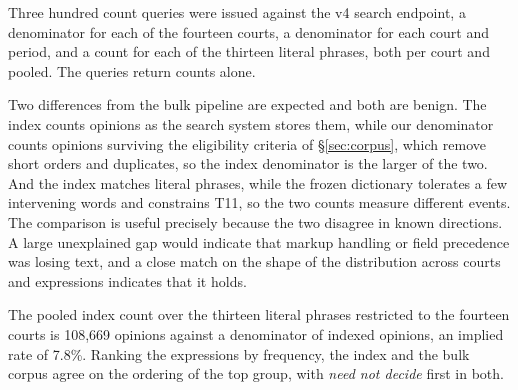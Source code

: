 Three hundred count queries were issued against the v4 search endpoint, a
denominator for each of the fourteen courts, a denominator for each court and
period, and a count for each of the thirteen literal phrases, both per court and
pooled. The queries return counts alone.

Two differences from the bulk pipeline are expected and both are benign. The
index counts opinions as the search system stores them, while our denominator
counts opinions surviving the eligibility criteria of \S\ref{sec:corpus}, which
remove short orders and duplicates, so the index denominator is the larger of the
two. And the index matches literal phrases, while the frozen dictionary tolerates
a few intervening words and constrains T11, so the two counts measure different
events. The comparison is useful precisely because the two disagree in known
directions. A large unexplained gap would indicate that markup handling or field
precedence was losing text, and a close match on the shape of the distribution
across courts and expressions indicates that it holds.

The pooled index count over the thirteen literal phrases restricted to the
fourteen courts is 108{,}669 opinions against a denominator of \ApiTotal{}
indexed opinions, an implied rate of 7.8\%. Ranking the expressions by frequency,
the index and the bulk corpus agree on the ordering of the top group, with
\emph{need not decide} first in both.


